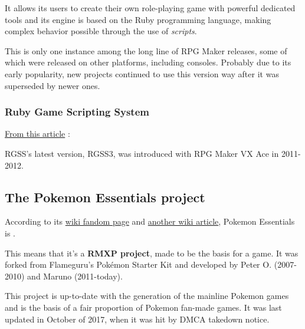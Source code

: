 \documentclass[11pt]{article}
\begin{document}
It allows its users to create their own role-playing game with powerful dedicated tools and its engine is based on the Ruby programming language, making complex behavior possible through the use of \textit{scripts}.


This is only one instance among the long line of RPG Maker releases, some of which were released on other platforms, including consoles. Probably due to its early popularity, new projects continued to use this version way after it was superseded by newer ones.



\subsubsection{Ruby Game Scripting System}

\href{https://rmvxace.fandom.com/wiki/RGSS}{From this article} : 


RGSS's latest version, RGSS3, was introduced with RPG Maker VX Ace in 2011-2012.






\subsection{The Pokemon Essentials project}


According to its \href{https://essentialsdocs.fandom.com/wiki/Essentials_Docs_Wiki}{wiki fandom page} and \href{https://pokemon-fan-game.fandom.com/wiki/Pok\%C3\%A9mon_Essentials}{another wiki article}, Pokemon Essentials is .

This means that it's a \textbf{RMXP project}, made to be the basis for a game. It was forked from Flameguru's Pokémon Starter Kit and developed by Peter O. (2007-2010) and Maruno (2011-today).

This project is up-to-date with the  generation of the mainline Pokemon games and is the basis of a fair proportion of Pokemon fan-made games. It was last updated in October of 2017, when it was hit by DMCA takedown notice.
\end{document}
